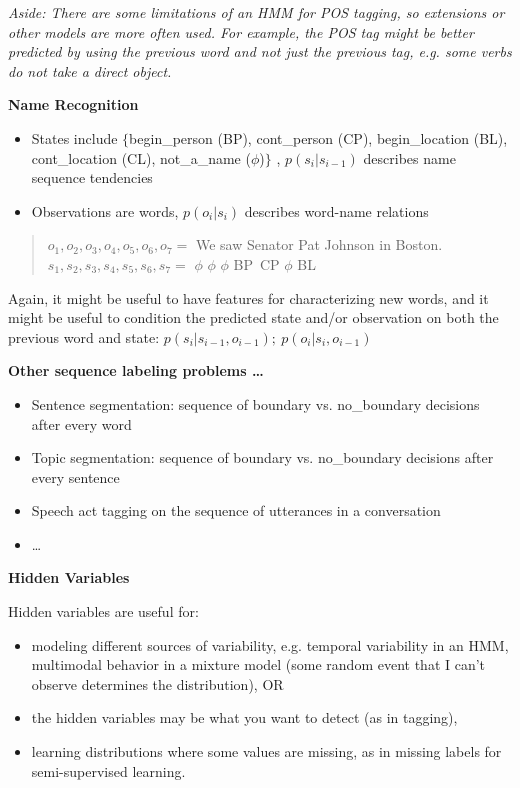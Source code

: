 \documentclass[11pt,titlepage]{article}
\begin{document}
{\Large \em Aside: There are some limitations of an HMM for POS tagging, so
extensions or other models are more often used.
For example, the POS tag might be
better predicted by using the previous word and not just the previous tag, 
e.g. some verbs do not take a direct object.
}

\clearpage

{\bf Name Recognition}

\begin{itemize}
\item States include $\{$begin\_person (BP), cont\_person (CP), begin\_location (BL),
cont\_location (CL), not\_a\_name ($\phi$)$\}$ , $p(s_i|s_{i-1})$ describes name sequence tendencies 
\item Observations are words, $p(o_i|s_i)$ describes word-name relations
\end{itemize}

\begin{quote}
$o_1, o_2, o_3, o_4, o_5, o_6, o_7 = $ We saw Senator Pat Johnson in Boston.\\
$s_1, s_2, s_3, s_4, s_5, s_6, s_7 = $ $\phi$ $\phi$ $\phi$ BP\ CP $\phi$ BL
\end{quote}

Again, it might be useful to have features for characterizing new
words, and it might be useful to condition the predicted state and/or
observation on both the previous word and state:
$ p(s_i|s_{i-1},o_{i-1});\ p(o_i|s_i,o_{i-1})$

\vskip 0.2in
{\bf Other sequence labeling problems \ldots}

\begin{itemize}
\item Sentence segmentation: sequence of boundary vs. no\_boundary decisions
after every word
\item Topic segmentation: sequence of boundary vs. no\_boundary decisions after
every sentence
\item Speech act tagging on the sequence of utterances in a conversation
\item \ldots
\end{itemize}

\clearpage

\centerline{{\LARGE \bf Hidden Variables}}
\vskip 0.2in

Hidden variables are useful for:
\begin{itemize}
\item modeling different sources of
variability, e.g. temporal variability in an
HMM, multimodal behavior in a mixture model (some random event that I can't
observe determines the distribution), OR
\item the hidden variables may be what you want to detect (as in tagging),
\item learning distributions where some values are missing, as in missing labels for semi-supervised learning.
\end{itemize}
\end{document}
